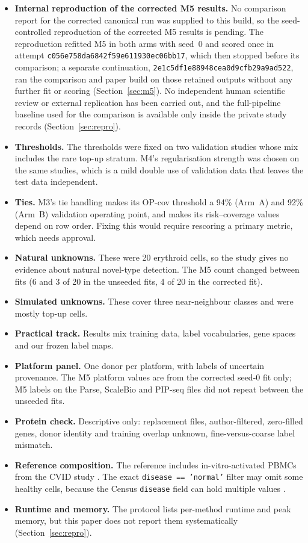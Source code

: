 \documentclass[11pt]{article}
\newcommand{\cfailid}{\nolinkurl{c056e758da6842f59e611930ec06bb17}}
\newcommand{\ccontid}{\nolinkurl{2e1c5df1e88948cea0d9cfb29a9ad522}}
\newif\ifctreport
\newcommand{\Reprostatus}{\ifctreport A seed-controlled reproduction of the corrected M5 results was run and compared with the corrected canonical run by the repository's tiered comparison; that internal comparison reports overall status ``\ctres{comparison}{report}{overall}''. This is an internal tolerance comparison by the same pipeline, not independent verification\else No comparison report for the corrected canonical run was supplied to this build, so the seed-controlled reproduction of the corrected M5 results is pending\fi}
\begin{document}
\begin{itemize}
\item \textbf{Internal reproduction of the corrected M5 results.} \Reprostatus. The reproduction refitted M5 in both arms with seed~0 and scored once in attempt \cfailid, which then stopped before its comparison; a separate continuation, \ccontid, ran the comparison and paper build on those retained outputs without any further fit or scoring (Section~\ref{sec:m5}). No independent human scientific review or external replication has been carried out, and the full-pipeline baseline used for the comparison is available only inside the private study records (Section~\ref{sec:repro}).
\item \textbf{Thresholds.} The thresholds were fixed on two validation studies whose mix includes the rare top-up stratum. M4's regularisation strength was chosen on the same studies, which is a mild double use of validation data that leaves the test data independent.
\item \textbf{Ties.} M3's tie handling makes its OP-cov threshold a 94\% (Arm~A) and 92\% (Arm~B) validation operating point, and makes its risk--coverage values depend on row order. Fixing this would require rescoring a primary metric, which needs approval.
\item \textbf{Natural unknowns.} These were 20 erythroid cells, so the study gives no evidence about natural novel-type detection. The M5 count changed between fits (6 and 3 of 20 in the unseeded fits, 4 of 20 in the corrected fit).
\item \textbf{Simulated unknowns.} These cover three near-neighbour classes and were mostly top-up cells.
\item \textbf{Practical track.} Results mix training data, label vocabularies, gene spaces and our frozen label maps.
\item \textbf{Platform panel.} One donor per platform, with labels of uncertain provenance. The M5 platform values are from the corrected seed-0 fit only; M5 labels on the Parse, ScaleBio and PIP-seq files did not repeat between the unseeded fits.
\item \textbf{Protein check.} Descriptive only: replacement files, author-filtered, zero-filled genes, donor identity and training overlap unknown, fine-versus-coarse label mismatch.
\item \textbf{Reference composition.} The reference includes in-vitro-activated PBMCs from the CVID study \citep{rodriguezubreva2022cvid}. The exact \texttt{disease == 'normal'} filter may omit some healthy cells, because the Census \texttt{disease} field can hold multiple values \citep{censusreleases}.
\item \textbf{Runtime and memory.} The protocol lists per-method runtime and peak memory, but this paper does not report them systematically (Section~\ref{sec:repro}).
\end{itemize}
\end{document}
